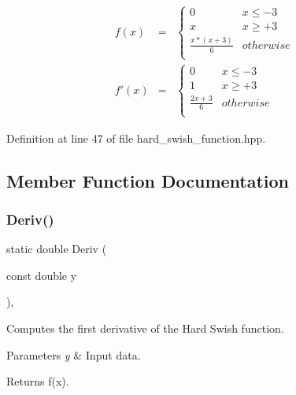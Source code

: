 \begin{eqnarray*} f(x) &=& \begin{cases} 0 & x \leq -3\\ x & x \geq +3\\ \frac{x * (x + 3)}{6} & otherwise\\ \end{cases} \\ f'(x) &=& \begin{cases} 0 & x \leq -3\\ 1 & x \geq +3\\ \frac{2x + 3}{6} & otherwise\\ \end{cases} \end{eqnarray*} 

Definition at line 47 of file hard\+\_\+swish\+\_\+function.\+hpp.



\subsection{Member Function Documentation}
\mbox{\label{classmlpack_1_1ann_1_1HardSwishFunction_a163d34fd09f8edf457164f5033c635cf}} 
\subsubsection{Deriv()\hspace{0.1cm}{\footnotesize\ttfamily [1/2]}}
{\footnotesize\ttfamily static double Deriv (\begin{DoxyParamCaption}\item[{const double}]{y }\end{DoxyParamCaption})\hspace{0.3cm}{\ttfamily [inline]}, {\ttfamily [static]}}



Computes the first derivative of the Hard Swish function. 


\begin{DoxyParams}{Parameters}
{\em y} & Input data. \\
\hline
\end{DoxyParams}
\begin{DoxyReturn}{Returns}
f\textquotesingle{}(x). 
\end{DoxyReturn}


